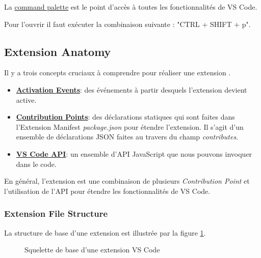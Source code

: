 \documentclass[
    iict, %
    il, %
]{heig-tb}
\begin{document}
La \href{https://code.visualstudio.com/docs/getstarted/userinterface#_command-palette}{command palette}
est le point d'accès à toutes les fonctionnalités de VS Code.

Pour l'ouvrir il faut exécuter la combinaison suivante : "CTRL + SHIFT + p".

\subsection{Extension Anatomy}
Il y a trois concepts cruciaux à comprendre pour réaliser une extension \cite{extension-anatomy} .

\begin{itemize}
    \item \href{https://code.visualstudio.com/api/references/activation-events}{\textbf{Activation Events}}: des événements à partir desquels l'extension devient active.
    \item \href{https://code.visualstudio.com/api/references/contribution-points}{\textbf{Contribution Points}}: des déclarations statiques qui sont faites dans l'Extension Manifest \emph{package.json} pour étendre l'extension. Il s'agit d'un ensemble de déclarations JSON faites au travers du champ \emph{contributes}.
    \item \href{https://code.visualstudio.com/api/references/vscode-api}{\textbf{VS Code API}}: un ensemble d'API JavaScript que nous pouvons invoquer dans le code.
\end{itemize}

En général, l'extension est une combinaison de plusieurs \emph{Contribution Point} et l'utilisation de l'API pour étendre les fonctionnalités de VS Code.

\subsubsection{Extension File Structure}\label{Extension File Structure}

La structure de base d'une extension est illustrée par la figure \ref{Squelette de base d'une extension VS Code}.

\begin{figure}[H] %
    \centering
    \caption[Squelette de base d'une extension VS Code]{\label{Squelette de base d'une extension VS Code} Squelette de base d'une extension VS Code}
\end{figure}
\end{document}
